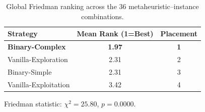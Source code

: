 \begin{table}[htbp]
  \centering
  \caption{Global Friedman ranking across the 36 metaheuristic--instance combinations.}
  \label{tab:friedman_inst29}
  \begin{tabular}{lcc}
    \toprule
    \textbf{Strategy} &
    \textbf{Mean Rank (1=Best)} &
    \textbf{Placement} \\
    \midrule
    \textbf{Binary-Complex}          & \textbf{1.97} & \textbf{1} \\
    Vanilla-Exploration              &   2.31 &  2 \\
    Binary-Simple                    &   2.31 &  3 \\
    Vanilla-Exploitation             &   3.42 &  4 \\
    \bottomrule
  \end{tabular}
  \vspace{1ex}

  \footnotesize Friedman statistic:
  $\chi^2=25.80$, $p=0.0000$.
\end{table}
